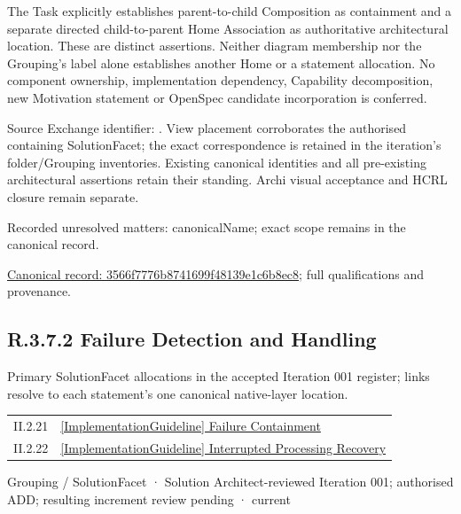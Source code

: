 The Task explicitly establishes parent-to-child Composition as containment and
a separate directed child-to-parent Home Association as authoritative architectural
location. These are distinct assertions. Neither diagram membership nor the
Grouping's label alone establishes another Home or a statement allocation.
No component ownership, implementation dependency, Capability decomposition,
new Motivation statement or OpenSpec candidate incorporation is conferred.



Source Exchange identifier: \texttt{}. View placement corroborates
the authorised containing SolutionFacet; the exact correspondence is retained in the
iteration's folder/Grouping inventories. Existing canonical identities and all
pre-existing architectural assertions retain their standing. Archi visual
acceptance and HCRL closure remain separate.


{\small Recorded unresolved matters: canonicalName; exact scope remains in the canonical record.}\par
{\footnotesize \href{../../../../../../../continuum/grouping/3566f7776b8741699f48139e1c6b8ec8.md}{Canonical record: 3566f7776b8741699f48139e1c6b8ec8}; full qualifications and provenance.}\par
\subsection*{R.3.7.2 Failure Detection and Handling}
\label{navigation:R.3.7.2}

Primary SolutionFacet allocations in the accepted Iteration 001 register; links resolve to each statement’s one canonical native-layer location.\par
\begin{longtable}{p{.22\linewidth}p{.73\linewidth}}
II.2.21 & \hyperref[element:93e40f54c22846538d91dc901ee34633]{[ImplementationGuideline] Failure Containment} \\
II.2.22 & \hyperref[element:6ca05ae8b3b34c1493ecdb48cfda1979]{[ImplementationGuideline] Interrupted Processing Recovery} \\
\end{longtable}
\label{element:e9804b6dea5c4e1db80be1925463786f}
{\small Grouping / SolutionFacet · Solution Architect-reviewed Iteration 001; authorised ADD; resulting increment review pending · current}\par

